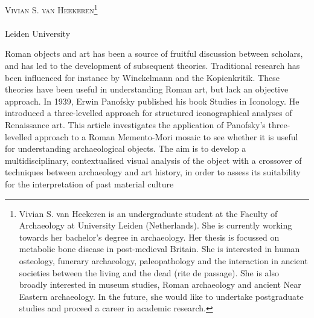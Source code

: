 \openingarticle
\def\ppages{\pagerange{heekeren:firstpage}{heekeren:lastpage}}
\def\shorttitle{A Method and an Object}
\def\maintitle{A Method and an Object: An Art Historical Approach Applied to the ‘Memento-Mori’ Mosaic from Pompeii, Italy}
\def\shortauthor{Vivian S. van Heekeren}
\def\authormail{v.s.van.heekeren@umail.leidenuniv.nl}
\def\affiliation{Leiden University}
\def\thanknote{\footnote{Vivian S. van Heekeren is an undergraduate student at the Faculty of Archaeology at University Leiden (Netherlands). She is currently working towards her bachelor’s degree in archaeology. Her thesis is focussed on metabolic bone disease in post-medieval Britain. She is interested in human osteology, funerary archaeology, paleopathology and the interaction in ancient societies between the living and the dead (rite de passage). She is also broadly interested in museum studies, Roman archaeology and ancient Near Eastern archaeology. 	In the future, she would like to undertake postgraduate studies and proceed a career in academic research.}}
\begin{center}
	{\Large\scshape\shortauthor \thanknote}\\[1em]
	\email \\
	\affiliation
\end{center}
\vspace{3em}
\midarticle
\label{heekeren:firstpage}

	\begin{myabstract}Roman objects and art has been a source of fruitful discussion between scholars, and has led to the development of subsequent theories. Traditional research has been influenced for instance by Winckelmann and the Kopienkritik. These theories have been useful in understanding Roman art, but lack an objective approach. In 1939, Erwin Panofsky published his book Studies in Iconology. He introduced a three-levelled approach for structured iconographical analyses of Renaissance art. This article investigates the application of Panofsky’s three-levelled approach to a Roman Memento-Mori mosaic to see whether it is useful for understanding archaeological objects. The aim is to develop a multidisciplinary, contextualised visual analysis of the object with a crossover of techniques between archaeology and art history, in order to assess its suitability for the interpretation of past material culture		
		
	\end{myabstract}
	

